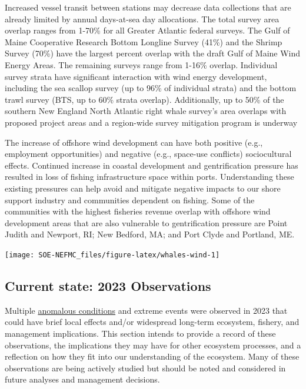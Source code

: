 \documentclass[
  10pt,
]{article}
\let\origfigure\figure
\let\endorigfigure\endfigure
\renewenvironment{figure}[1][2] {
    \expandafter\origfigure\expandafter[H]
} {
    \endorigfigure
}
\begin{document}
Increased vessel transit between stations may decrease data collections that are already limited by annual days-at-sea day allocations. The total survey area overlap ranges from 1-70\% for all Greater Atlantic federal surveys. The Gulf of Maine Cooperative Research Bottom Longline Survey (41\%) and the Shrimp Survey (70\%) have the largest percent overlap with the draft Gulf of Maine Wind Energy Areas. The remaining surveys range from 1-16\% overlap. Individual survey strata have significant interaction with wind energy development, including the sea scallop survey (up to 96\% of individual strata) and the bottom trawl survey (BTS, up to 60\% strata overlap). Additionally, up to 50\% of the southern New England North Atlantic right whale survey's area overlaps with proposed project areas and a region-wide survey mitigation program is underway

The increase of offshore wind development can have both positive (e.g., employment opportunities) and negative (e.g., space-use conflicts) sociocultural effects. Continued increase in coastal development and gentrification pressure has resulted in loss of fishing infrastructure space within ports. Understanding these existing pressures can help avoid and mitigate negative impacts to our shore support industry and communities dependent on fishing. Some of the communities with the highest fisheries revenue overlap with offshore wind development areas that are also vulnerable to gentrification pressure are Point Judith and Newport, RI; New Bedford, MA; and Port Clyde and Portland, ME.

\begin{figure}

{\centering \texttt{[image: SOE-NEFMC\_files/figure-latex/whales-wind-1]} 

}

\caption{Northern Right Whale persistent hotspots and Wind Energy Areas. Areas outlined in black show active or proposed wind energy leases.}\label{fig:whales-wind}
\end{figure}
\newpage

\hypertarget{current-state-2023-observations}{%
\subsection{Current state: 2023 Observations}\label{current-state-2023-observations}}

Multiple \href{https://noaa-edab.github.io/catalog/observation-synthesis.html}{anomalous conditions} and extreme events were observed in 2023 that could have brief local effects and/or widespread long-term ecosystem, fishery, and management implications. This section intends to provide a record of these observations, the implications they may have for other ecosystem processes, and a reflection on how they fit into our understanding of the ecosystem. Many of these observations are being actively studied but should be noted and considered in future analyses and management decisions.
\end{document}
